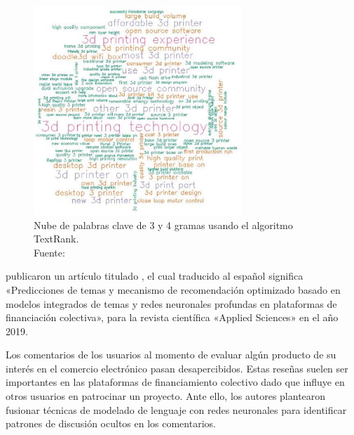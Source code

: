 \begin{figure}[!ht]
	\begin{center}
		\includegraphics[width=0.70\textwidth]{2/figures/chaichi2019.jpg}
		\caption[Nube de palabras clave de 3 y 4 gramas usando el algoritmo TextRank]{Nube de palabras clave de 3 y 4 gramas usando el algoritmo TextRank.\\
		Fuente: \cite{pr_chaichi2019nlp_3dprinting}}
		\label{2:fig127}
	\end{center}
\end{figure}

\cite{pr_shafqat2019topicpredictions} publicaron un artículo titulado , el cual traducido al español significa «Predicciones de temas y mecanismo de recomendación optimizado basado en modelos integrados de temas y redes neuronales profundas en plataformas de financiación colectiva», para la revista científica «Applied Sciences» en el año 2019.

Los comentarios de los usuarios al momento de evaluar algún producto de su interés en el comercio electrónico pasan desapercibidos. Estas reseñas suelen ser importantes en las plataformas de financiamiento colectivo dado que influye en otros usuarios en patrocinar un proyecto. Ante ello, los autores plantearon fusionar técnicas de modelado de lenguaje con redes neuronales para identificar patrones de discusión ocultos en los comentarios.

